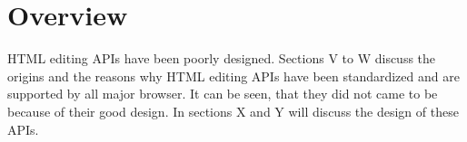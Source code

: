 \chapter{Overview}

HTML editing APIs have been poorly designed. Sections V to W discuss the origins and the reasons why HTML editing APIs have been standardized and are supported by all major browser. It can be seen, that they did not came to be because of their good design. In sections X and Y will discuss the design of these APIs.


